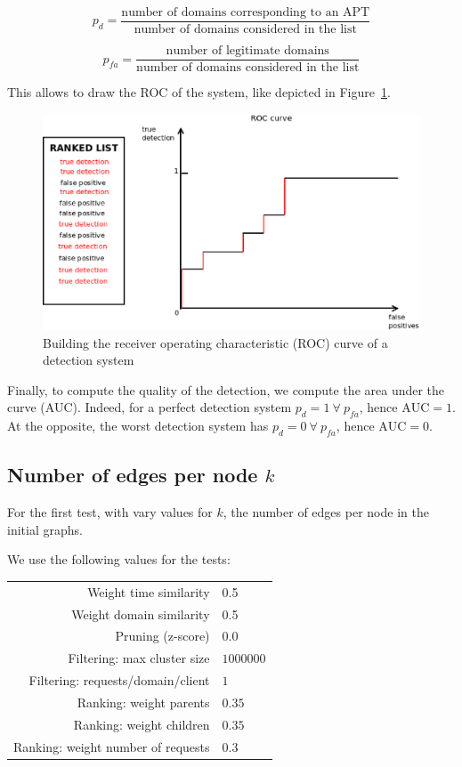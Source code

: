\documentclass[conference]{IEEEtran}
\begin{document}
$$p_d = \frac{\text{number of domains corresponding to an APT}}{\text{number of domains considered in the list}}$$

$$p_{fa} = \frac{\text{number of legitimate domains}}{\text{number of domains considered in the list}}$$

This allows to draw the ROC of the system, like depicted in Figure~\ref{fig:roc}.

\begin{figure}
  \centering
  \includegraphics[width=1.0\linewidth]{bench_roc.eps}
  \caption{Building the receiver operating characteristic (ROC) curve of a detection system}
  \label{fig:roc}
\end{figure}

Finally, to compute the quality of the detection, we compute the area under the curve (AUC). Indeed, for a perfect detection system $p_d = 1 \ \forall \ p_{fa}$, hence $\text{AUC} = 1$. At the opposite, the worst detection system has $p_d = 0 \ \forall \ p_{fa}$, hence $\text{AUC} = 0$.

\subsection{Number of edges per node $k$}

For the first test, with vary values for $k$, the number of edges per node in the initial graphs.

We use the following values for the tests:

{\small
  \begin{tabularx}{\linewidth}{rl}
  \hline
  Weight time similarity & 0.5 \\ 
  Weight domain similarity & 0.5 \\ 
  Pruning (z-score) & 0.0 \\
  Filtering: max cluster size & $1000000$ \\ 
  Filtering: requests/domain/client & $1$ \\ 
  Ranking: weight parents & $0.35$ \\ 
  Ranking: weight children & $0.35$ \\ 
  Ranking: weight number of requests & $0.3$ \\
  \hline
  \end{tabularx}
}
\end{document}
